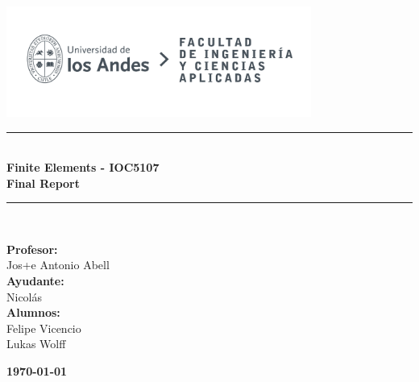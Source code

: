 \documentclass{article}  %
\begin{document}
\begin{titlepage}%
\newcommand{\HRule}{\rule{\linewidth}{0.5mm}} 
\center 
\includegraphics[width=10cm]{LOGO_UNIVERSIDAD.jpg}\\ %
\vspace{3cm}
\HRule \\[0.4cm]
{ \huge \bfseries Finite Elements - IOC5107}\\[0.4cm] %
{ \huge \bfseries Final Report}\\[0.4cm] %
\HRule \\[1.5cm]
 \vspace{5cm}
\begin{flushright}
  { \textbf{Profesor:}\\
  Jos+e Antonio Abell\\
  \textbf{Ayudante:}\\
  Nicolás\\
  \textbf{Alumnos:} \\
  Felipe Vicencio\\
  Lukas Wolff\\
}
\end{flushright}
\vspace{1cm}
{\large \textbf{\today}}\\[2cm] %
\end{titlepage}
\end{document}
